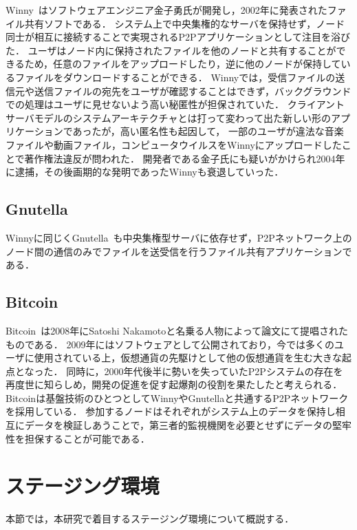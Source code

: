 Winny~\cite{Winny}はソフトウェアエンジニア金子勇氏が開発し，2002年に発表されたファイル共有ソフトである．
システム上で中央集権的なサーバを保持せず，ノード同士が相互に接続することで実現されるP2Pアプリケーションとして注目を浴びた．
ユーザはノード内に保持されたファイルを他のノードと共有することができるため，任意のファイルをアップロードしたり，逆に他のノードが保持しているファイルをダウンロードすることができる．
Winnyでは，受信ファイルの送信元や送信ファイルの宛先をユーザが確認することはできず，バックグラウンドでの処理はユーザに見せないよう高い秘匿性が担保されていた．
クライアントサーバモデルのシステムアーキテクチャとは打って変わって出た新しい形のアプリケーションであったが，高い匿名性も起因して，
一部のユーザが違法な音楽ファイルや動画ファイル，コンピュータウイルスをWinnyにアップロードしたことで著作権法違反が問われた．
開発者である金子氏にも疑いがかけられ2004年に逮捕，その後画期的な発明であったWinnyも衰退していった．

\subsection{Gnutella}

Winnyに同じくGnutella~\cite{Gnutella}も中央集権型サーバに依存せず，P2Pネットワーク上のノード間の通信のみでファイルを送受信を行うファイル共有アプリケーションである．

\subsection{Bitcoin}

Bitcoin~\cite{Bitcoin}は2008年にSatoshi Nakamotoと名乗る人物によって論文にて提唱されたものである．
2009年にはソフトウェアとして公開されており，今では多くのユーザに使用されている上，仮想通貨の先駆けとして他の仮想通貨を生む大きな起点となった．
同時に，2000年代後半に勢いを失っていたP2Pシステムの存在を再度世に知らしめ，開発の促進を促す起爆剤の役割を果たしたと考えられる．
Bitcoinは基盤技術のひとつとしてWinnyやGnutellaと共通するP2Pネットワークを採用している．
参加するノードはそれぞれがシステム上のデータを保持し相互にデータを検証しあうことで，第三者的監視機関を必要とせずにデータの堅牢性を担保することが可能である．

\section{ステージング環境}
\label{bg:staging}

本節では，本研究で着目するステージング環境について概説する．

